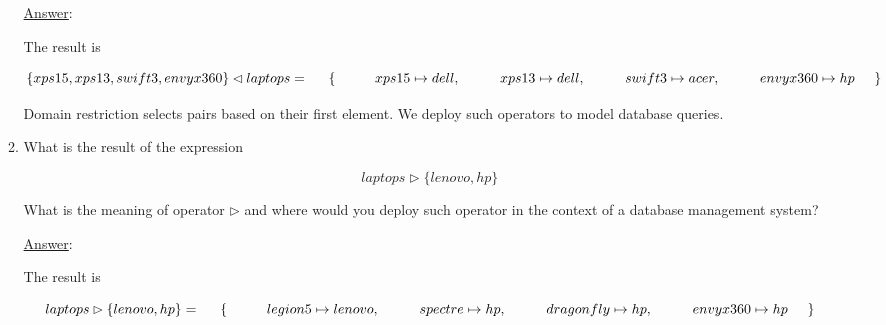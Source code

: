 \documentclass[12pt]{article}
\begin{document}
\begin{itemize}
\begin{enumerate}
                        \newpage

                        \noindent \underline{Answer}:

                        \noindent The result is

                        \[ \{ xps15, xps13, swift3, envyx360 \}  \lhd laptops = \\
                              \hspace{5mm} \{ \\
                              \hspace{10mm} xps15 \mapsto dell,\\
                              \hspace{10mm} xps13 \mapsto dell,\\
                              \hspace{10mm} swift3 \mapsto acer,\\
                              \hspace{10mm} envyx360 \mapsto hp\\
                              \hspace{5mm} \}
                        \]

                        \noindent Domain restriction selects pairs based on their first element. We deploy such operators to model database queries.


                  \item What is the result of the expression

                        \[ laptops \rhd \{ lenovo, hp \} \]

                        \noindent What is the meaning of operator $\rhd$ and where would you deploy such operator in the context of a database management system?

                        \noindent \underline{Answer}:

                        \noindent The result is


                        \[ laptops \rhd \{ lenovo, hp \} = \\
                              \hspace{5mm} \{ \\
                              \hspace{10mm} legion5 \mapsto lenovo,\\
                              \hspace{10mm} spectre \mapsto hp,\\
                              \hspace{10mm} dragonfly \mapsto hp,\\
                              \hspace{10mm} envyx360 \mapsto hp\\
                              \hspace{5mm} \}
                        \]


\end{enumerate}
\end{itemize}
\end{document}
